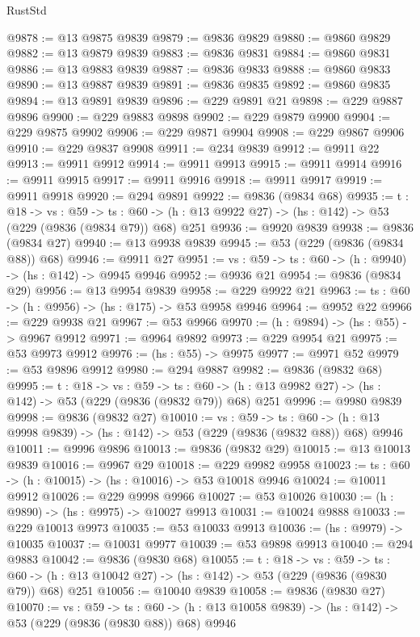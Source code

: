 \begin{lexlean}{RustStd}
\begin{coremodule}
@9878 := @13 @9875 @9839
@9879 := @9836 @9829
@9880 := @9860 @9829
@9882 := @13 @9879 @9839
@9883 := @9836 @9831
@9884 := @9860 @9831
@9886 := @13 @9883 @9839
@9887 := @9836 @9833
@9888 := @9860 @9833
@9890 := @13 @9887 @9839
@9891 := @9836 @9835
@9892 := @9860 @9835
@9894 := @13 @9891 @9839
@9896 := @229 @9891 @21
@9898 := @229 @9887 @9896
@9900 := @229 @9883 @9898
@9902 := @229 @9879 @9900
@9904 := @229 @9875 @9902
@9906 := @229 @9871 @9904
@9908 := @229 @9867 @9906
@9910 := @229 @9837 @9908
@9911 := @234 @9839
@9912 := @9911 @22
@9913 := @9911 @9912
@9914 := @9911 @9913
@9915 := @9911 @9914
@9916 := @9911 @9915
@9917 := @9911 @9916
@9918 := @9911 @9917
@9919 := @9911 @9918
@9920 := @294 @9891
@9922 := @9836 (@9834 @68)
@9935 := {t : @18} ->
  {vs : @59} ->
  {ts : @60} -> (h : @13 @9922 @27) -> (hs : @142) -> @53 (@229 (@9836 (@9834 @79)) @68) @251
@9936 := @9920 @9839
@9938 := @9836 (@9834 @27)
@9940 := @13 @9938 @9839
@9945 := @53 (@229 (@9836 (@9834 @88)) @68)
@9946 := @9911 @27
@9951 := {vs : @59} -> {ts : @60} -> (h : @9940) -> (hs : @142) -> @9945 @9946
@9952 := @9936 @21
@9954 := @9836 (@9834 @29)
@9956 := @13 @9954 @9839
@9958 := @229 @9922 @21
@9963 := {ts : @60} -> (h : @9956) -> (hs : @175) -> @53 @9958 @9946
@9964 := @9952 @22
@9966 := @229 @9938 @21
@9967 := @53 @9966
@9970 := (h : @9894) -> (hs : @55) -> @9967 @9912
@9971 := @9964 @9892
@9973 := @229 @9954 @21
@9975 := @53 @9973 @9912
@9976 := (hs : @55) -> @9975
@9977 := @9971 @52
@9979 := @53 @9896 @9912
@9980 := @294 @9887
@9982 := @9836 (@9832 @68)
@9995 := {t : @18} ->
  {vs : @59} ->
  {ts : @60} -> (h : @13 @9982 @27) -> (hs : @142) -> @53 (@229 (@9836 (@9832 @79)) @68) @251
@9996 := @9980 @9839
@9998 := @9836 (@9832 @27)
@10010 := {vs : @59} ->
  {ts : @60} -> (h : @13 @9998 @9839) -> (hs : @142) -> @53 (@229 (@9836 (@9832 @88)) @68) @9946
@10011 := @9996 @9896
@10013 := @9836 (@9832 @29)
@10015 := @13 @10013 @9839
@10016 := @9967 @29
@10018 := @229 @9982 @9958
@10023 := {ts : @60} -> (h : @10015) -> (hs : @10016) -> @53 @10018 @9946
@10024 := @10011 @9912
@10026 := @229 @9998 @9966
@10027 := @53 @10026
@10030 := (h : @9890) -> (hs : @9975) -> @10027 @9913
@10031 := @10024 @9888
@10033 := @229 @10013 @9973
@10035 := @53 @10033 @9913
@10036 := (hs : @9979) -> @10035
@10037 := @10031 @9977
@10039 := @53 @9898 @9913
@10040 := @294 @9883
@10042 := @9836 (@9830 @68)
@10055 := {t : @18} ->
  {vs : @59} ->
  {ts : @60} -> (h : @13 @10042 @27) -> (hs : @142) -> @53 (@229 (@9836 (@9830 @79)) @68) @251
@10056 := @10040 @9839
@10058 := @9836 (@9830 @27)
@10070 := {vs : @59} ->
  {ts : @60} -> (h : @13 @10058 @9839) -> (hs : @142) -> @53 (@229 (@9836 (@9830 @88)) @68) @9946

\end{coremodule}
\end{lexlean}
